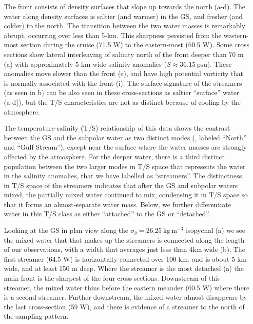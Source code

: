 \documentclass[draft,grl]{agutex2015}
\begin{document}
\begin{article}
The front consists of density surfaces that slope up towards the north (a-d).  The water along density surfaces is saltier (and warmer) in the GS, and fresher (and colder) to the north. The transition between the two water masses is remarkably abrupt, occurring over less than 5-km.  This sharpness persisted from the western-most section during the cruise (71.5 W) to the eastern-most (60.5 W). Some cross sections show lateral interleaving of salinity north of the front deeper than 70 m (a) with approximately 5-km wide salinity anomalies ($S \approx 36.15\ \mathrm{psu}$).  These anomalies move slower than the front (e), and have high potential vorticity that is normally associated with the front (i).  The surface signature of the streamers (as seen in b) can be also seen in these cross-sections as saltier ``surface'' water (a-d)), but the T/S characteristics are not as distinct because of cooling by the atmosphere.  

The temperature-salinity (T/S) relationship of this data shows the contrast between the GS and the subpolar water as two distinct modes (, labeled ``North'' and ``Gulf Stream''), except near the surface where the water masses are strongly affected by the atmosphere.  For the deeper water, there is a third distinct population between the two larger modes in T/S space that represents the water in the salinity anomalies, that we have labelled as ``streamers''.  The distinctness in T/S space of the streamers indicates that after the GS and subpolar waters mixed, the partially mixed water continued to mix, condensing it in T/S space so that it forms an almost-separate water mass. Below, we further differentiate water in this T/S class as either ``attached'' to the GS or ``detached''.   

Looking at the GS in plan view along the $\sigma_{\theta} = 26.25\ \mathrm{kg\,m^{-3}}$ isopycnal (a) we see the mixed water that that makes up the streamers is connected along the length of our observations, with a width that averages just less than 4km wide (b). The first streamer (64.5 W) is horizontally connected over 100 km, and is about 5 km wide, and at least 150 m deep.  Where the streamer is the most detached (a) the main front is the sharpest of the four cross sections.    Downstream of this streamer, the mixed water thins before the eastern meander (60.5 W) where there is a second streamer.  Further downstream, the mixed water almost disappears by the last cross-section (59 W), and there is evidence of a streamer to the north of the sampling pattern.  


\end{article}
\end{document}
